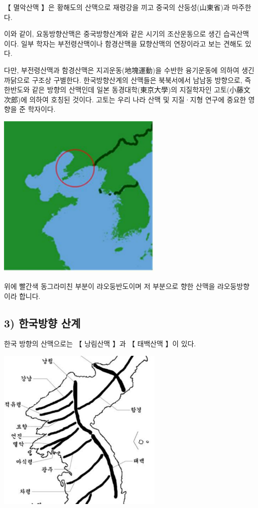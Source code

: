 \documentclass[12pt,a4paper]{book}
\begin{document}
【 멸악산맥 】은 황해도의 산맥으로 재령강을 끼고 중국의 산둥성(山東省)과 마주한다.

이와 같이, 요동방향산맥은 중국방향산계와 같은 시기의 조산운동으로 생긴 습곡산맥이다. 일부 학자는 부전령산맥이나 함경산맥을 묘향산맥의 연장이라고 보는 견해도 있다.

다만, 부전령산맥과 함경산맥은 지괴운동(地塊運動)을 수반한 융기운동에 의하여 생긴 까닭으로 구조상 구별한다. 한국방향산계의 산맥들은 북북서에서 남남동 방향으로, 즉 한반도와 같은 방향의 산맥인데 일본 동경대학(東京大學)의 지질학자인 고토(小藤文次郎)에 의하여 호칭된 것이다. 고토는 우리 나라 산맥 및 지질·지형 연구에 중요한 영향을 준 학자이다.

				\includegraphics[width=0.6\textwidth]{./fig/fig__113.pdf}


위에 빨간색 동그라미친 부분이 랴오둥반도이며
저 부분으로 향한 산맥을 랴오둥방향이라 합니다.


		\newpage  \null
		\subsection{3) 한국방향 산계}
		\null



한국 방향의 산맥으로는 【 낭림산맥 】과 【 태백산맥 】이 있다. 

				\includegraphics[width=0.6\textwidth]{./fig/fig__114.pdf}
\end{document}
